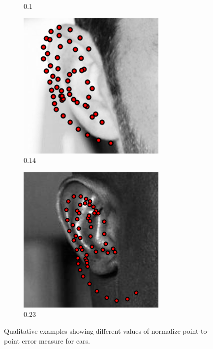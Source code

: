 \begin{figure}[t!]
\begin{subfigure}[b]{0.115\textwidth}
    \caption{$0.1$}
    \end{subfigure}
    \begin{subfigure}[b]{0.115\textwidth}
            \includegraphics[height=1\textwidth]{resources/Fig_Alignment/ear_14_55}
    \caption{$0.14$}
    \end{subfigure}
    \begin{subfigure}[b]{0.115\textwidth}
            \includegraphics[height=1\textwidth]{resources/Fig_Alignment/ear_23_55}
    \caption{$0.23$}
    \end{subfigure}
\caption{Qualitative examples showing different values of normalize point-to-point error measure for ears.}
\label{fig:ear_error}
\end{figure}


